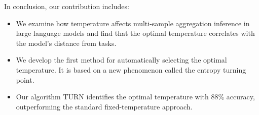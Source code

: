 In conclusion, our contribution includes:
\begin{itemize}
    \item We examine how temperature affects multi-sample aggregation inference in large language models and find that the optimal temperature correlates with the model's distance from tasks.
    \item We develop the first method for automatically selecting the optimal temperature. It is based on a new phenomenon called the entropy turning point. 
    \item Our algorithm \textsc{TURN} identifies the optimal temperature with 88\% accuracy, outperforming the standard fixed-temperature approach.
\end{itemize}

%